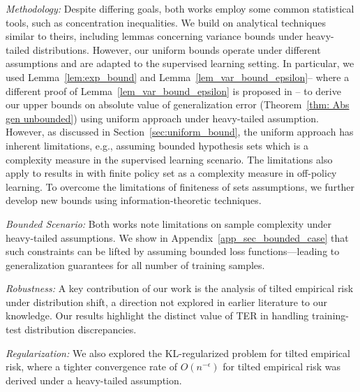 \documentclass{article}
\theoremstyle{plain}
\theoremstyle{plain}
\theoremstyle{definition}
\theoremstyle{remark}
\begin{document}
\textit{Methodology:} Despite differing goals, both works employ some common statistical tools, such as concentration inequalities. We build on analytical techniques similar to theirs, including lemmas concerning variance bounds under heavy-tailed distributions. However, our uniform bounds operate under different assumptions and are adapted to the supervised learning setting. In particular, we used Lemma~\ref{lem:exp_bound} and Lemma~\ref{lem_var_bound_epsilon}-- where a different proof of Lemma~\ref{lem_var_bound_epsilon} is proposed in \citep[Theorem~5.3]{behnamnialog}-- to derive our upper bounds on absolute value of generalization error (Theorem~\ref{thm: Abs gen unbounded}) using uniform approach under heavy-tailed assumption. However, as discussed in Section~\ref{sec:uniform_bound}, the uniform approach has inherent limitations, e.g., assuming bounded hypothesis sets which is a complexity measure in the supervised learning scenario. The limitations also apply to results in \citep[Theorem~5.3]{behnamnialog} with finite policy set as a complexity measure in off-policy learning. To overcome the limitations of finiteness of sets assumptions, we further develop new bounds using information-theoretic techniques.

\textit{Bounded Scenario:} Both works note limitations on sample complexity under heavy-tailed assumptions. We show in Appendix~\ref{app_sec_bounded_case} that such constraints can be lifted by assuming bounded loss functions—leading to generalization guarantees for all number of training samples.

\textit{Robustness:} A key contribution of our work is the analysis of tilted empirical risk under distribution shift, a direction not explored in earlier literature to our knowledge. Our results highlight the distinct value of TER in handling training-test distribution discrepancies. 

\textit{Regularization:} We also explored the KL-regularized problem for tilted empirical risk, where a tighter convergence rate of $O(n^{-\epsilon})$ for tilted empirical risk was derived under a heavy-tailed assumption. 



\end{document}
